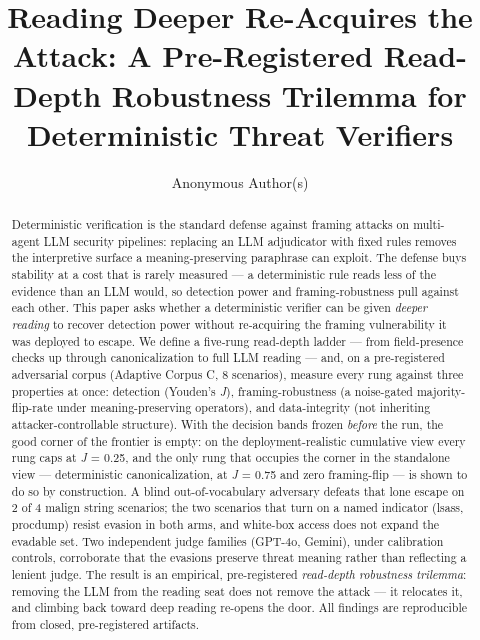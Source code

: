 \documentclass[sigconf,anonymous,review]{acmart}
\title{Reading Deeper Re-Acquires the Attack: A Pre-Registered Read-Depth Robustness Trilemma for Deterministic Threat Verifiers}
\author{Anonymous Author(s)}
\affiliation{%
  \institution{Submission under double-blind review}
  \country{}
}
\begin{document}
\begin{abstract}
Deterministic verification is the standard defense against framing attacks on multi-agent LLM security pipelines: replacing an LLM adjudicator with fixed rules removes the interpretive surface a meaning-preserving paraphrase can exploit. The defense buys stability at a cost that is rarely measured --- a deterministic rule reads less of the evidence than an LLM would, so detection power and framing-robustness pull against each other. This paper asks whether a deterministic verifier can be given \textit{deeper reading} to recover detection power without re-acquiring the framing vulnerability it was deployed to escape. We define a five-rung read-depth ladder --- from field-presence checks up through canonicalization to full LLM reading --- and, on a pre-registered adversarial corpus (Adaptive Corpus C, 8 scenarios), measure every rung against three properties at once: detection (Youden's \textit{J}), framing-robustness (a noise-gated majority-flip-rate under meaning-preserving operators), and data-integrity (not inheriting attacker-controllable structure). With the decision bands frozen \textit{before} the run, the good corner of the frontier is empty: on the deployment-realistic cumulative view every rung caps at \textit{J} = 0.25, and the only rung that occupies the corner in the standalone view --- deterministic canonicalization, at \textit{J} = 0.75 and zero framing-flip --- is shown to do so by construction. A blind out-of-vocabulary adversary defeats that lone escape on 2 of 4 malign string scenarios; the two scenarios that turn on a named indicator (lsass, procdump) resist evasion in both arms, and white-box access does not expand the evadable set. Two independent judge families (GPT-4o, Gemini), under calibration controls, corroborate that the evasions preserve threat meaning rather than reflecting a lenient judge. The result is an empirical, pre-registered \textit{read-depth robustness trilemma}: removing the LLM from the reading seat does not remove the attack --- it relocates it, and climbing back toward deep reading re-opens the door. All findings are reproducible from closed, pre-registered artifacts.

\end{abstract}
\maketitle
\end{document}
